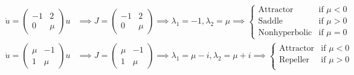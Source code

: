 \documentclass[12pt]{article}
\begin{document}
\begin{enumerate}[(i)]
          \color{blue}
          \begin{align*}
              \dot{u} = \begin{pmatrix} -1 & 2 \\ 0 & \mu \end{pmatrix} u   & \implies J = \begin{pmatrix} -1 & 2 \\ 0 & \mu \end{pmatrix} \implies \lambda_1 = -1, \lambda_2 = \mu \implies \begin{cases}
                                                                                                                                                                                                 \text{Attractor}     & \text{if } \mu < 0 \\
                                                                                                                                                                                                 \text{Saddle}        & \text{if } \mu > 0 \\
                                                                                                                                                                                                 \text{Nonhyperbolic} & \text{if } \mu = 0
                                                                                                                                                                                             \end{cases}            \\
              \dot{u} = \begin{pmatrix} \mu & -1 \\ 1 & \mu \end{pmatrix} u & \implies J = \begin{pmatrix} \mu & -1 \\ 1 & \mu \end{pmatrix} \implies \lambda_1 = \mu - i, \lambda_2 = \mu + i \implies \begin{cases}
                                                                                                                                                                                                            \text{Attractor}     & \text{if } \mu < 0 \\
                                                                                                                                                                                                            \text{Repeller}      & \text{if } \mu > 0 \\

\end{cases}
\end{align*}
\end{enumerate}
\end{document}
